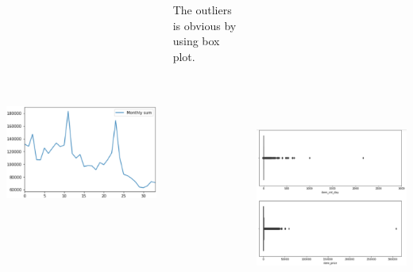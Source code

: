 \documentclass{tikzposter} %
\begin{document}
\begin{columns}
{\begin{tikzfigure}%
    	\includegraphics[width=15cm, height=10cm]{figures/sum.eps}
\end{tikzfigure}
    The outliers is obvious by using box plot.
\begin{tikzfigure}%
	\includegraphics[width=15cm, height=13cm]{figures/outliers.eps}
\end{tikzfigure}
}



\end{columns}
\end{document}
